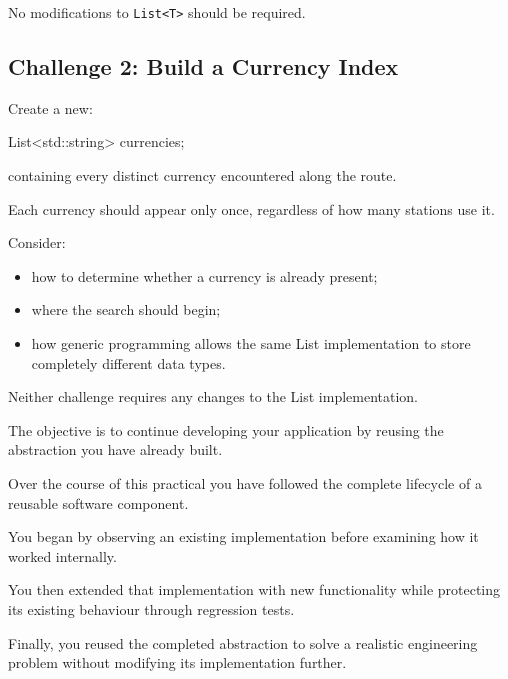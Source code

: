 \documentclass{csc2059practical}
\begin{document}
No modifications to \texttt{List<T>} should be required.


\subsection*{Challenge 2: Build a Currency Index}

Create a new:

\begin{cppcode}
List<std::string> currencies;
\end{cppcode}

containing every distinct currency encountered along the route.

Each currency should appear only once, regardless of how many stations use it.

Consider:

\begin{itemize}
    \item how to determine whether a currency is already present;
    \item where the search should begin;
    \item how generic programming allows the same List implementation to store completely different data types.
\end{itemize}


\begin{tipbox}
Neither challenge requires any changes to the List implementation.

The objective is to continue developing your application by reusing the abstraction you have already built.
\end{tipbox}



Over the course of this practical you have followed the complete lifecycle of a reusable software component.

You began by observing an existing implementation before examining how it worked internally.

You then extended that implementation with new functionality while protecting its existing behaviour through regression tests.

Finally, you reused the completed abstraction to solve a realistic engineering problem without modifying its implementation further.
\end{document}
